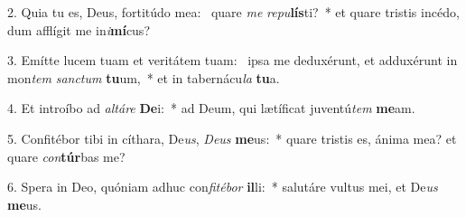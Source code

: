 2. Quia tu es, Deus, fortitúdo mea: \dag\  quare \textit{me} \textit{re}\textit{pu}\textbf{lís}ti?~*  et quare tristis incédo, dum afflígit me in\textit{i}\textbf{mí}cus?\

3. Emítte lucem tuam et veritátem tuam: \dag\  ipsa me deduxérunt, et adduxérunt in mon\textit{tem} \textit{sanc}\textit{tum} \textbf{tu}um,~*  et in tabernácu\textit{la} \textbf{tu}a.\

4. Et introíbo ad \textit{al}\textit{tá}\textit{re} \textbf{De}i:~*  ad Deum, qui lætíficat juventú\textit{tem} \textbf{me}am.\

5. Confitébor tibi in cíthara, De\textit{us}, \textit{De}\textit{us} \textbf{me}us:~*  quare tristis es, ánima mea? et quare \textit{con}\textbf{túr}bas me?\

6. Spera in Deo, quóniam adhuc con\textit{fi}\textit{té}\textit{bor} \textbf{il}li:~*  salutáre vultus mei, et De\textit{us} \textbf{me}us.\

